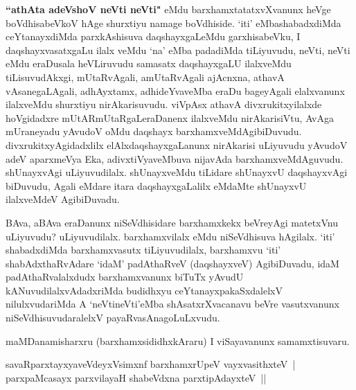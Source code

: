 \begin{center}
\end{center}

\centerline{}

\begin{artha}
\textbf{``athAta adeVshoV neVti neVti"} eMdu barxhamxtatatxvXvanunx heVge
boVdhisabeVkoV hAge shurxtiyu namage boVdhiside. `iti' eMbashabadxdiMda
ceYtanayxdiMda parxkAshisuva daqshayxgaLeMdu garxhisabeVku, I
daqshayxvasatxgaLu ilalx veMdu `na' eMba padadiMda  tiLiyuvudu, neVti,
neVti eMdu eraDusala heVLiruvudu samasatx daqshayxgaLU ilalxveMdu
tiLisuvudAkxgi, mUtaRvAgali, amUtaRvAgali ajAcnxna, athavA
vAsanegaLAgali, adhAyxtamx, adhideYvaveMba eraDu bageyAgali
elalxvanunx ilalxveMdu shurxtiyu nirAkarisuvudu. viVpAsx athavA
divxrukitxyilalxde hoVgidadxre mUtARmUtaRgaLeraDanenx ilalxveMdu
nirAkarisiVtu, AvAga mUraneyadu yAvudoV oMdu daqshayx
barxhamxveMdAgibiDuvudu. divxrukitxyAgidadxlilx elAlxdaqshayxgaLanunx
nirAkarisi uLiyuvudu yAvudoV adeV aparxmeVya Eka, adivxtiVyaveMbuva
nijavAda barxhamxveMdAguvudu. shUnayxvAgi uLiyuvudilalx. shUnayxveMdu
tiLidare shUnayxvU daqshayxvAgi biDuvudu, Agali eMdare itara
daqshayxgaLalilx eMdaMte shUnayxvU ilalxveMdeV AgibiDuvadu.

BAva, aBAva eraDanunx niSeVdhisidare barxhamxkekx beVreyAgi matetxVnu
uLiyuvudu? uLiyuvudilalx. barxhamxvilalx eMdu niSeVdhisuva
hAgilalx. `iti' shabadxdiMda barxhamxvasutx tiLiyuvudilalx, barxhamxvu
`iti' shabAdxthaRvAdare `idaM' padAthaRveV (daqshayxveV) AgibiDuvadu,
idaM padAthaRvalalxdudx barxhamxvanunx biTuTx yAvudU
kANuvudilalxvAdadxriMda budidhxyu ceYtanayxpakaSxdalelxV nilulxvudariMda A
`neVtineVti'eMba shAsatxrXvacanavu beVre vasutxvanunx
niSeVdhisuvudaralelxV payaRvasAnagoLuLxvudu.

maMDanamisharxru (barxhamxsididhxkAraru) I viSayavanunx
samamxtisuvaru. 
\end{artha}

\begin{shl}
savaRparxtayxyaveVdeyxV\s simxnf barxhamxrUpeV vayxvasithxteV~|
parxpaMcasayx parxvilayaH shabeVdxna parxtipAdayxteV~||
\end{shl}

